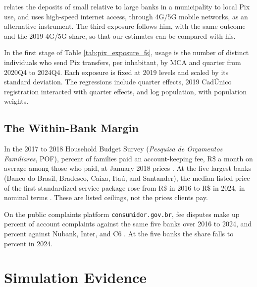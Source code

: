 \textcite{sarkisyan2024instant} relates the deposits of small relative to large banks in a municipality to local Pix use, and uses high-speed internet access, through 4G/5G mobile networks, as an alternative instrument. The third exposure follows him, with the same outcome and the 2019 4G/5G share, so that our estimates can be compared with his.

In the first stage of Table \ref{tab:pix_exposure_fs}, usage is the number of distinct individuals who send Pix transfers, per inhabitant, by MCA and quarter from 2020Q4 to 2024Q4. Each exposure is fixed at 2019 levels and scaled by its standard deviation. The regressions include quarter effects, 2019 Cad\'{U}nico registration interacted with quarter effects, and log population, with population weights.


\subsection{The Within-Bank Margin}\label{app:netflow:withinbank}

In the 2017 to 2018 Household Budget Survey (\textit{Pesquisa de Or\c{c}amentos Familiares}, POF),  percent of families paid an account-keeping fee, R\$ a month on average among those who paid, at January 2018 prices \parencite{ibge_pof2017_2019}. At the five largest banks (Banco do Brasil, Bradesco, Caixa, Ita\'{u}, and Santander), the median listed price of the first standardized service package rose from R\$ in 2016 to R\$ in 2024, in nominal terms \parencite{bcb_tarifas_mensal}. These are listed ceilings, not the prices clients pay.

On the public complaints platform \texttt{consumidor.gov.br}, fee disputes make up  percent of account complaints against the same five banks over 2016 to 2024, and  percent against Nubank, Inter, and C6 \parencite{senacon_consumidor_dados}. At the five banks the share falls to  percent in 2024.

\section{Simulation Evidence}\label{app:simulation}

